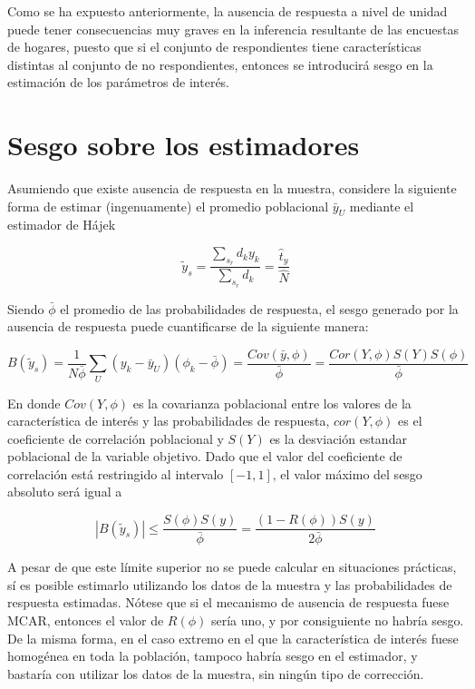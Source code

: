 \documentclass[
  10pt,
  spanish,
]{book}
\begin{document}
Como se ha expuesto anteriormente, la ausencia de respuesta a nivel de unidad puede tener consecuencias muy graves en la inferencia resultante de las encuestas de hogares, puesto que si el conjunto de respondientes tiene características distintas al conjunto de no respondientes, entonces se introducirá sesgo en la estimación de los parámetros de interés.

\hypertarget{sesgo-sobre-los-estimadores}{%
\section{Sesgo sobre los estimadores}\label{sesgo-sobre-los-estimadores}}

Asumiendo que existe ausencia de respuesta en la muestra, considere la siguiente forma de estimar (ingenuamente) el promedio poblacional \(\bar{y}_U\) mediante el estimador de Hájek

\[
\tilde{y}_s = \frac{\sum_{s_r}d_ky_k}{\sum_{s_r}d_k} = \frac{\hat{t}_y}{\hat{N}}
\]

Siendo \(\bar{\phi}\) el promedio de las probabilidades de respuesta, el sesgo generado por la ausencia de respuesta puede cuantificarse de la siguiente manera:

\[
B\left(\tilde{y}_s\right)  = 
\frac{1}{N\bar{\phi}}\sum_U(y_k-\bar{y}_U)(\phi_k-\bar{\phi})
= \frac{Cov\left(\bar{y},\phi\right)}{\bar{\phi}}
= \frac{Cor\left(Y,\phi\right)S\left(Y\right)S\left(\phi\right)}{\bar{\phi}}
\]

En donde \(Cov\left(Y,\phi\right)\) es la covarianza poblacional entre
los valores de la característica de interés y las probabilidades de respuesta,
\(cor\left(Y,\phi\right)\) es el coeficiente de correlación poblacional
y \(S\left(Y\right)\) es la desviación estandar poblacional de la variable objetivo. Dado que el valor del coeficiente de correlación está restringido
al intervalo \([-1, 1]\), el valor máximo del sesgo absoluto será igual a

\[
|B\left(\tilde{y}_s\right)| \leq 
\frac{S\left(\phi\right)S\left(y\right)}{\bar{\phi}}
= \frac{\left(1-R\left(\phi\right)\right)S\left(y\right)}{2\bar{\phi}}
\]

A pesar de que este límite superior no se puede calcular en situaciones prácticas, sí es posible estimarlo utilizando los datos de la muestra y las probabilidades
de respuesta estimadas. Nótese que si el mecanismo de ausencia de respuesta fuese MCAR, entonces el valor de \(R\left(\phi\right)\) sería uno, y por consiguiente no habría sesgo. De la misma forma, en el caso extremo en el que la característica de interés fuese homogénea en toda la población, tampoco habría sesgo en el estimador, y bastaría con utilizar los datos de la muestra, sin ningún tipo de corrección.
\end{document}
